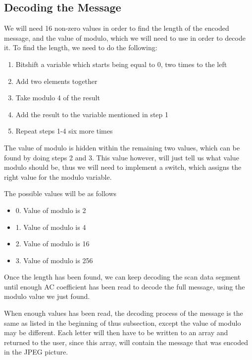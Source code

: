 \subsection{Decoding the Message}
We will need 16 non-zero values in order to find the length of the encoded message, and the value of modulo, which we will need to use in order to decode it. To find the length, we need to do the following:
\begin{enumerate}
	\item Bitshift a variable which starts being equal to 0, two times to the left
	\item Add two elements together
	\item Take modulo 4 of the result
	\item Add the result to the variable mentioned in step 1
	\item Repeat steps 1-4 six more times
\end{enumerate}
The value of modulo is hidden within the remaining two values, which can be found by doing steps 2 and 3. This value however, will just tell us what value modulo should be, thus we will need to implement a switch, which assigns the right value for the modulo variable.

The possible values will be as follows
\begin{itemize}
	\item 0. Value of modulo is 2
	\item 1. Value of modulo is 4
	\item 2. Value of modulo is 16
	\item 3. Value of modulo is 256
\end{itemize}
Once the length has been found, we can keep decoding the scan data segment until enough AC coefficient has been read to decode the full message, using the modulo value we just found.

When enough values has been read, the decoding process of the message is the same as listed in the beginning of thus subsection, except the value of modulo may be different. 
Each letter will then have to be written to an array and returned to the user, since this array, will contain the message that was encoded in the JPEG picture.